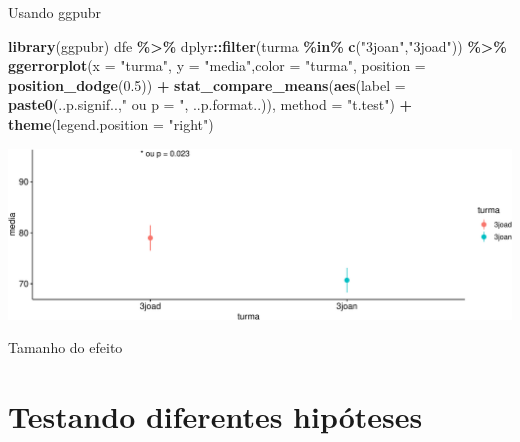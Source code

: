 \documentclass[
  9pt,
  ignorenonframetext,
  aspectratio=169]{beamer}
\newenvironment{Shaded}{\begin{snugshade}}{\end{snugshade}}
\newcommand{\DataTypeTok}[1]{\textcolor[rgb]{0.13,0.29,0.53}{#1}}
\newcommand{\FloatTok}[1]{\textcolor[rgb]{0.00,0.00,0.81}{#1}}
\newcommand{\KeywordTok}[1]{\textcolor[rgb]{0.13,0.29,0.53}{\textbf{#1}}}
\newcommand{\NormalTok}[1]{#1}
\newcommand{\OperatorTok}[1]{\textcolor[rgb]{0.81,0.36,0.00}{\textbf{#1}}}
\newcommand{\StringTok}[1]{\textcolor[rgb]{0.31,0.60,0.02}{#1}}
\begin{document}
\begin{frame}[fragile]{Usando ggpubr}
\protect\hypertarget{usando-ggpubr}{}
\begin{Shaded}
\begin{Highlighting}[]
\KeywordTok{library}\NormalTok{(ggpubr)}
\NormalTok{dfe }\OperatorTok{\%\textgreater{}\%}\StringTok{ }\NormalTok{dplyr}\OperatorTok{::}\KeywordTok{filter}\NormalTok{(turma }\OperatorTok{\%in\%}\StringTok{ }\KeywordTok{c}\NormalTok{(}\StringTok{"3joan"}\NormalTok{,}\StringTok{"3joad"}\NormalTok{)) }\OperatorTok{\%\textgreater{}\%}\StringTok{ }
\StringTok{  }\KeywordTok{ggerrorplot}\NormalTok{(}\DataTypeTok{x =} \StringTok{"turma"}\NormalTok{, }\DataTypeTok{y =} \StringTok{"media"}\NormalTok{,}\DataTypeTok{color =} \StringTok{"turma"}\NormalTok{,}
              \DataTypeTok{position =} \KeywordTok{position\_dodge}\NormalTok{(}\FloatTok{0.5}\NormalTok{)) }\OperatorTok{+}
\StringTok{  }\KeywordTok{stat\_compare\_means}\NormalTok{(}\KeywordTok{aes}\NormalTok{(}\DataTypeTok{label =} \KeywordTok{paste0}\NormalTok{(..p.signif..,}\StringTok{" ou p = "}\NormalTok{, ..p.format..)),}
                     \DataTypeTok{method =} \StringTok{"t.test"}\NormalTok{) }\OperatorTok{+}\StringTok{ }\KeywordTok{theme}\NormalTok{(}\DataTypeTok{legend.position =} \StringTok{"right"}\NormalTok{)}
\end{Highlighting}
\end{Shaded}

\includegraphics{aula_11_files/figure-beamer/unnamed-chunk-8-1.pdf}
\end{frame}

\begin{frame}{Tamanho do efeito}
\protect\hypertarget{tamanho-do-efeito}{}
\end{frame}

\begin{frame}{}
\protect\hypertarget{section}{}
\end{frame}

\hypertarget{testando-diferentes-hipuxf3teses}{%
\section{Testando diferentes
hipóteses}\label{testando-diferentes-hipuxf3teses}}
\end{document}
